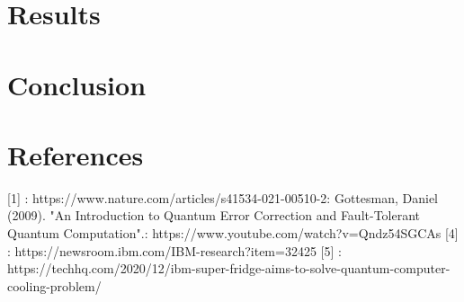 \documentclass{article}
\begin{document}
\section{Results}
\section{Conclusion}
\section{References}
[1] : https://www.nature.com/articles/s41534-021-00510-2\newline
[2] : Gottesman, Daniel (2009). "An Introduction to Quantum Error Correction 
and Fault-Tolerant Quantum Computation".\newline
[3] : https://www.youtube.com/watch?v=Qndz54SGCAs
[4] : https://newsroom.ibm.com/IBM-research?item=32425
[5] : https://techhq.com/2020/12/ibm-super-fridge-aims-to-solve-quantum-computer-cooling-problem/
\end{document}
